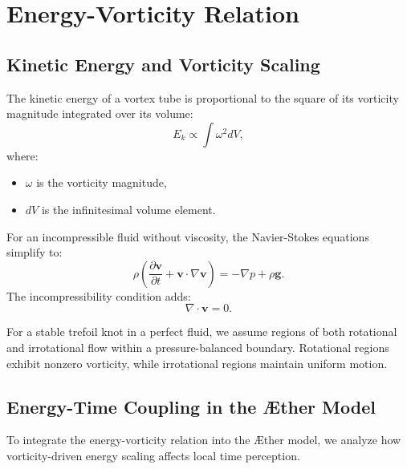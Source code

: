 

    \section{Energy-Vorticity Relation}

    \subsection*{Kinetic Energy and Vorticity Scaling}
    The kinetic energy of a vortex tube is proportional to the square of its vorticity magnitude integrated over its volume:
    \begin{equation}
        E_k \propto \int \omega^2 dV,
    \end{equation}
    where:
    \begin{itemize}
        \item $\omega$ is the vorticity magnitude,
        \item $dV$ is the infinitesimal volume element.
    \end{itemize}
    For an incompressible fluid without viscosity, the Navier-Stokes equations simplify to:
    \begin{equation}
        \rho \left( \frac{\partial \mathbf{v}}{\partial t} + \mathbf{v} \cdot \nabla \mathbf{v} \right) = - \nabla p + \rho \mathbf{g}.
    \end{equation}
    The incompressibility condition adds:
    \begin{equation}
        \nabla \cdot \mathbf{v} = 0.
    \end{equation}

    For a stable trefoil knot in a perfect fluid, we assume regions of both rotational and irrotational flow within a pressure-balanced boundary. Rotational regions exhibit nonzero vorticity, while irrotational regions maintain uniform motion.

    \subsection*{Energy-Time Coupling in the Æther Model}
    To integrate the energy-vorticity relation into the Æther model, we analyze how vorticity-driven energy scaling affects local time perception.


